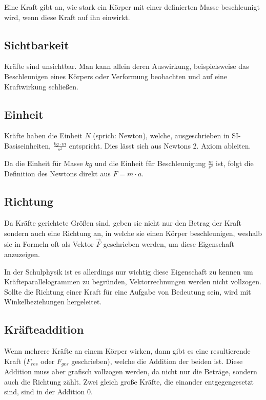 Eine Kraft gibt an, wie stark ein Körper mit einer definierten Masse beschleunigt wird, wenn diese Kraft auf ihn einwirkt. 


\subsection{Sichtbarkeit}

Kräfte sind unsichtbar. Man kann allein deren Auswirkung, beispielsweise das Beschleunigen eines Körpers oder Verformung beobachten und auf eine Kraftwirkung schließen.


\subsection{Einheit}

Kräfte haben die Einheit $N$ (sprich: \glqq Newton\grqq ), welche, ausgeschrieben in SI-Basiseinheiten, $\frac{kg \cdot m}{s^2}$ entspricht. Dies lässt sich aus Newtons 2. Axiom ableiten. 

Da die Einheit für Masse $kg$ und die Einheit für Beschleunigung $\frac{m}{s^2}$ ist, folgt die Definition des Newtons direkt aus $F = m \cdot a$.


\subsection{Richtung}

Da Kräfte gerichtete Größen sind, geben sie nicht nur den Betrag der Kraft sondern auch eine Richtung an, in welche sie einen Körper beschleunigen, weshalb sie in Formeln oft als Vektor $\vec{F}$ geschrieben werden, um diese Eigenschaft anzuzeigen.

\begin{Anmerkung}
In der Schulphysik ist es allerdings nur wichtig diese Eigenschaft zu kennen um Kräfteparallelogrammen zu begründen, Vektorrechnungen werden nicht vollzogen. Sollte die Richtung einer Kraft für eine Aufgabe von Bedeutung sein, wird mit Winkelbeziehungen hergeleitet.
\end{Anmerkung}

\subsection{Kräfteaddition}

Wenn mehrere Kräfte an einem Körper wirken, dann gibt es eine resultierende Kraft ($F_{res}$ oder $F_{ges}$ geschrieben), welche die Addition der beiden ist. Diese Addition muss aber grafisch vollzogen werden, da nicht nur die Beträge, sondern auch die Richtung zählt. Zwei gleich große Kräfte, die einander entgegengesetzt sind, sind in der Addition $0$.

